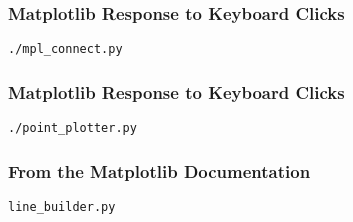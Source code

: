 \documentclass{beamer}
\begin{document}
\begin{frame}[fragile]
\frametitle{Matplotlib Response to Keyboard Clicks}
\texttt{./mpl\_connect.py}
\end{frame}

\begin{frame}[fragile]
\frametitle{Matplotlib Response to Keyboard Clicks}
\texttt{./point\_plotter.py}
\end{frame}

\begin{frame}[fragile]
\frametitle{From the Matplotlib Documentation}
\texttt{line\_builder.py}
\end{frame}
\end{document}
